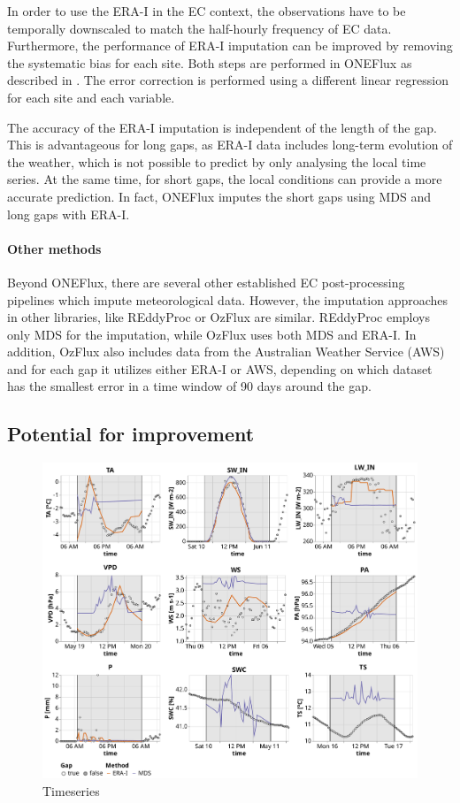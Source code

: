 \documentclass{article}
\newcommand{\imgwidth}{6in}
\let\Oldsubsection\subsection
\renewcommand{\subsection}{\FloatBarrier\Oldsubsection}
\begin{document}
In order to use the ERA-I in the EC context, the observations have to be temporally downscaled to match the half-hourly frequency of EC data. Furthermore, the performance of ERA-I imputation can be improved by removing the systematic bias for each site. Both steps are performed in \textsf{ONEFlux} as described in \cite{vuichard_filling_2015}. The error correction is performed using a different linear regression for each site and each variable.

The accuracy of the ERA-I imputation is independent of the length of the gap. This is advantageous for long gaps, as ERA-I data includes long-term evolution of the weather, which is not possible to predict by only analysing the local time series. At the same time, for short gaps, the local conditions can provide a more  accurate prediction.
In fact, \textsf{ONEFlux} imputes the short gaps using MDS and long gaps with ERA-I.

\paragraph{Other methods} Beyond \textsf{ONEFlux}, there are several other established EC post-processing pipelines which impute meteorological data. However, the imputation approaches in other libraries, like \textsf{REddyProc} \cite{wutzler_basic_2018} or \textsf{OzFlux} \cite{isaac_ozflux_2017} are similar. \textsf{REddyProc} employs only MDS for the imputation, while \textsf{OzFlux} uses both MDS and ERA-I. In addition, OzFlux also includes data from the Australian Weather Service (AWS) and for each gap it utilizes either ERA-I or AWS, depending on which dataset has the smallest error in a time window of 90 days around the gap.

\subsection{Potential for improvement}


\begin{figure}
    \centerline{\includegraphics[width=\imgwidth]{timeseries_sota.pdf}}
\caption{ Timeseries}
\label{fig:ts_sota}
\end{figure}
\end{document}
